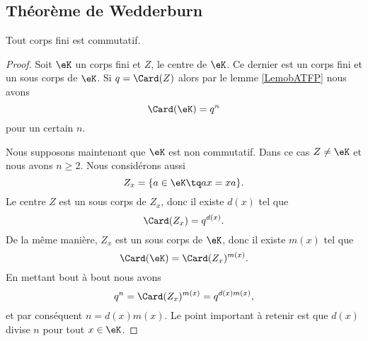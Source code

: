 \subsection{Théorème de Wedderburn}

\begin{theorem}
    Tout corps fini est commutatif.
\end{theorem}

\begin{proof}
    Soit \( \eK\) un corps fini et \( Z\), le centre de \( \eK\). Ce dernier est un corps fini et un sous corps de \( \eK\). Si \( q=\Card(Z)\) alors par le lemme \ref{LemobATFP} nous avons
    \begin{equation}
        \Card(\eK)=q^n
    \end{equation}
    pour un certain \( n\).

    Nous supposons maintenant que \( \eK\) est non commutatif. Dans ce cas \( Z\neq \eK\) et nous avons \( n\geq 2\). Nous considérons aussi
    \begin{equation}
        Z_x=\{ a\in \eK\tq ax=xa \}.
    \end{equation}
    Le centre \( Z\) est un sous corps de \( Z_x\), donc il existe \( d(x)\) tel  que
    \begin{equation}
        \Card(Z_x)=q^{d(x)}.
    \end{equation}
    De la même manière, \( Z_x\) est un sous corps de \( \eK\), donc il existe \( m(x)\) tel que
    \begin{equation}
        \Card(\eK)=\Card(Z_x)^{m(x)}.
    \end{equation}
    En mettant bout à bout nous avons
    \begin{equation}
        q^n=\Card(Z_x)^{m(x)}=q^{d(x)m(x)},
    \end{equation}
    et par conséquent \( n=d(x)m(x)\). Le point important à retenir est que \( d(x)\) divise \( n\) pour tout \( x\in \eK\).


\end{proof}
